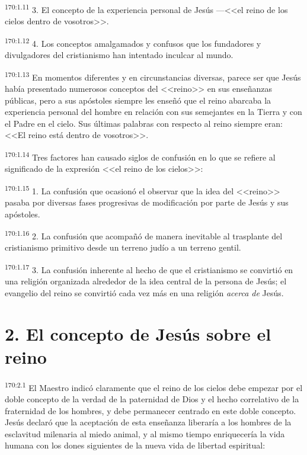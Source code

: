 \par 
\textsuperscript{170:1.11} 3. El concepto de la experiencia personal de Jesús ---<<el reino de los cielos dentro de vosotros>>.

\par 
\textsuperscript{170:1.12} 4. Los conceptos amalgamados y confusos que los fundadores y divulgadores del cristianismo han intentado inculcar al mundo.

\par 
\textsuperscript{170:1.13} En momentos diferentes y en circunstancias diversas, parece ser que Jesús había presentado numerosos conceptos del <<reino>> en sus enseñanzas públicas, pero a sus apóstoles siempre les enseñó que el reino abarcaba la experiencia personal del hombre en relación con sus semejantes en la Tierra y con el Padre en el cielo. Sus últimas palabras con respecto al reino siempre eran: <<El reino está dentro de vosotros>>.

\par 
\textsuperscript{170:1.14} Tres factores han causado siglos de confusión en lo que se refiere al significado de la expresión <<el reino de los cielos>>:

\par 
\textsuperscript{170:1.15} 1. La confusión que ocasionó el observar que la idea del <<reino>> pasaba por diversas fases progresivas de modificación por parte de Jesús y sus apóstoles.

\par 
\textsuperscript{170:1.16} 2. La confusión que acompañó de manera inevitable al trasplante del cristianismo primitivo desde un terreno judío a un terreno gentil.

\par 
\textsuperscript{170:1.17} 3. La confusión inherente al hecho de que el cristianismo se convirtió en una religión organizada alrededor de la idea central de la persona de Jesús; el evangelio del reino se convirtió cada vez más en una religión \textit{acerca de} Jesús.

\section*{2. El concepto de Jesús sobre el reino}
\par 
\textsuperscript{170:2.1} El Maestro indicó claramente que el reino de los cielos debe empezar por el doble concepto de la verdad de la paternidad de Dios y el hecho correlativo de la fraternidad de los hombres, y debe permanecer centrado en este doble concepto. Jesús declaró que la aceptación de esta enseñanza liberaría a los hombres de la esclavitud milenaria al miedo animal, y al mismo tiempo enriquecería la vida humana con los dones siguientes de la nueva vida de libertad espiritual:

